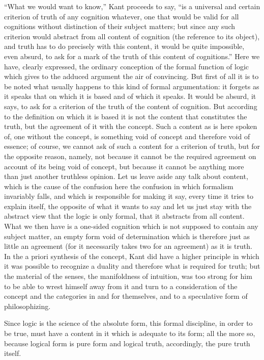 “What we would want to know,” Kant proceeds to say,
“is a universal and certain criterion of
truth of any cognition whatever,
one that would be valid for all cognitions
without distinction of their subject matters;
but since any such criterion would abstract from
all content of cognition (the reference to its object),
and truth has to do precisely with this content,
it would be quite impossible, even absurd,
to ask for a mark of the truth
of this content of cognitions.”
Here we have, clearly expressed,
the ordinary conception of
the formal function of logic
which gives to the adduced argument
the air of convincing.
But first of all it is to be noted
what usually happens to this
kind of formal argumentation:
it forgets as it speaks that on which it is based
and of which it speaks.
It would be absurd, it says, to ask for a criterion
of the truth of the content of cognition.
But according to the definition on
which it is based it is not
the content that constitutes the truth,
but the agreement of it with the concept.
Such a content as is here spoken of,
one without the concept,
is something void of concept
and therefore void of essence;
of course, we cannot ask of
such a content for a criterion of truth,
but for the opposite reason, namely,
not because it cannot be the required
agreement on account of its being void of concept,
but because it cannot be anything more than
just another truthless opinion.
Let us leave aside any talk about content,
which is the cause of the confusion here
the confusion in which formalism invariably falls,
and which is responsible for making it say,
every time it tries to explain itself,
the opposite of what it wants to say
and let us just stay with the abstract view
that the logic is only formal,
that it abstracts from all content.
What we then have is a one-sided cognition
which is not supposed to contain any subject matter,
an empty form void of determination
which is therefore just as little an agreement
(for it necessarily takes two for an agreement)
as it is truth.
In the a priori synthesis of the concept,
Kant did have a higher principle
in which it was possible to recognize a duality
and therefore what is required for truth;
but the material of the senses,
the manifoldness of intuition,
was too strong for him to be able
to wrest himself away from it
and turn to a consideration of the concept
and the categories in and for themselves,
and to a speculative form of philosophizing.

Since logic is the science of the absolute form,
this formal discipline, in order to be true,
must have a content in it which is adequate to its form;
all the more so, because logical form is pure form
and logical truth, accordingly, the pure truth itself.

